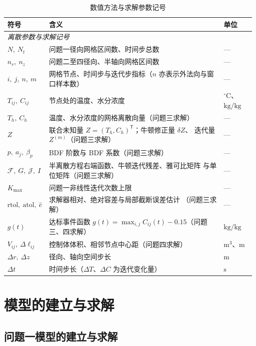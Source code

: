 \documentclass[12pt,a4paper]{ctexart}
\begin{document}
\begin{table}[H]
\centering
\footnotesize
\begin{tabularx}{\textwidth}{@{}lXl@{}}
\toprule
符号 & 含义 & 单位 \\
\midrule
\multicolumn{3}{l}{\textit{离散参数与求解记号}}\\
$N,\ N_t$ & 问题一径向网格区间数、时间步总数 & — \\
$n_r,\ n_z$ & 问题二至四径向、半轴向网格区间数 & — \\
$i,\ j,\ n,\ m$ & 网格节点、时间步与迭代步指标（$n$ 亦表示外法向与窗口样本数） & — \\
$T_{ij},\ C_{ij}$ & 节点处的温度、水分浓度 & $^\circ\mathrm{C}$、$\mathrm{kg/kg}$ \\
$T_h,\ C_h$ & 温度、水分浓度的网格离散向量（问题三求解） & — \\
$Z$ & 联合未知量 $Z=(T_h,C_h)^{\mathsf T}$；牛顿修正量 $\delta Z$、
迭代量 $Z^{(m)}$（问题三求解） & — \\
$p,\ a_j,\ \beta_p$ & BDF 阶数与 BDF 系数（问题三求解） & — \\
$\mathcal{F},\ G,\ \mathcal{J},\ I$ & 半离散方程右端函数、牛顿迭代残差、雅可比矩阵
与单位矩阵（问题三求解） & — \\
$K_{\max}$ & 问题一非线性迭代次数上限 & — \\
$\mathrm{rtol},\ \mathrm{atol},\ \hat e$ & 求解器相对、绝对容差与局部截断误差估计
（问题三求解） & — \\
$g(t)$ & 达标事件函数 $g(t)=\max_{i,j}C_{ij}(t)-0.15$（问题三、四求解） & $\mathrm{kg/kg}$ \\
$V_{ij},\ \Delta\ell_{ij}$ & 控制体体积、相邻节点中心距（问题四求解） & $\mathrm{m^3}$、$\mathrm{m}$ \\
$\Delta r,\ \Delta z$ & 径向、轴向空间步长 & $\mathrm{m}$ \\
$\Delta t$ & 时间步长（$\Delta T$、$\Delta C$ 为迭代变化量） & $\mathrm{s}$ \\
\bottomrule
\end{tabularx}
\caption{数值方法与求解参数记号}
\label{tab:numsymbols}
\end{table}


\section{模型的建立与求解}
\subsection{问题一模型的建立与求解}
\end{document}
